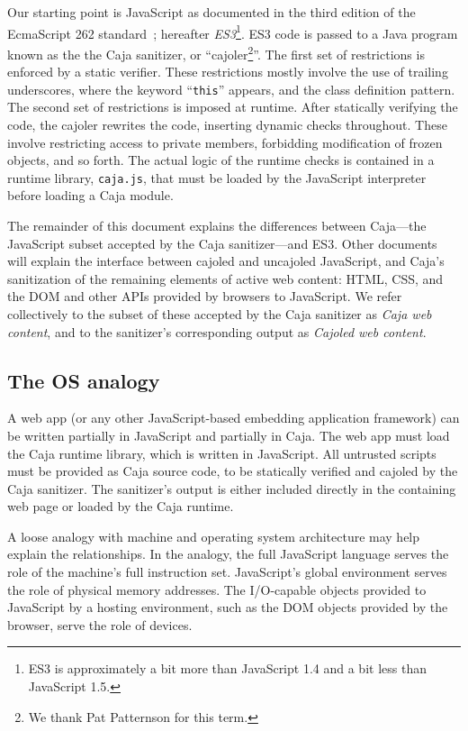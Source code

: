 \documentclass[letterpaper,twocolumn,10pt]{article}
\newcommand{\code}[1]{{\tt {#1}}}              %
\begin{document}
Our starting point is JavaScript as documented in the third edition of the 
EcmaScript 262 standard~\cite{ECMA-262}; hereafter \emph{ES3}\footnote{
%
ES3 is approximately a bit more than JavaScript 1.4 and a bit less than 
JavaScript 1.5.
%
}.  ES3 code is passed to a Java program known as the the Caja sanitizer, 
or ``cajoler\footnote{
%
We thank Pat Patternson for this term.
%
}''.  The first set of restrictions is enforced by a static verifier. 
These restrictions mostly involve the use of trailing underscores, 
where the keyword ``\code{this}'' appears, and the class definition pattern.
The second set of restrictions is imposed at runtime.  After statically 
verifying the code, the cajoler rewrites the code, inserting dynamic 
checks throughout. These involve restricting access to private members, 
forbidding modification of frozen objects, and so forth.  The actual 
logic of the runtime checks is contained in a runtime library, 
\code{caja.js}, that must be loaded by the JavaScript interpreter before 
loading a Caja module.

The remainder of this document explains the differences between Caja---the 
JavaScript subset accepted by the Caja sanitizer---and ES3. Other documents 
will explain the interface between cajoled and uncajoled JavaScript, and 
Caja's sanitization of the remaining elements of active web content: HTML, 
CSS, and the DOM and other APIs provided by browsers to JavaScript. We refer 
collectively to the subset of these accepted by the Caja sanitizer as 
\emph{Caja web content}, and to the sanitizer's corresponding output as 
\emph{Cajoled web content}.

\subsection{The OS analogy}
\label{subsec:os-analog}

A web app (or any other JavaScript-based embedding application framework) can 
be written partially in JavaScript and partially in Caja. The web app must load 
the Caja runtime library, which is written in JavaScript. All 
untrusted scripts must be provided as Caja source code, to be statically 
verified and cajoled by the Caja sanitizer. The sanitizer's output is 
either included directly in the containing web page or loaded by the Caja 
runtime.

A loose analogy with machine and operating system architecture may help 
explain the relationships. In the analogy, the full JavaScript language 
serves the role of the machine's full instruction set. JavaScript's global 
environment serves the role of physical memory addresses. The I/O-capable 
objects provided to JavaScript by a hosting environment, such as the DOM 
objects provided by the browser, serve the role of devices.
\end{document}
